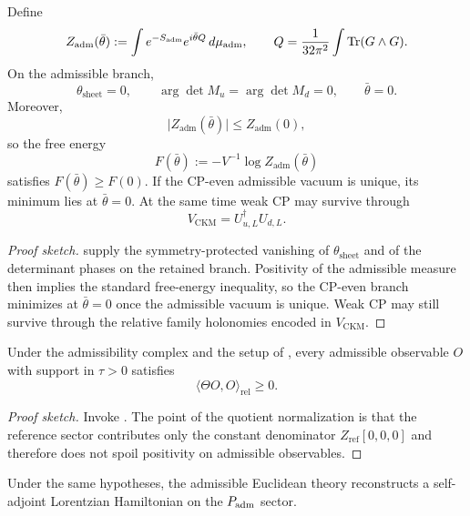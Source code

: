 
\begin{theorem}
\label{thm:strong-cp-closure}
Define
\[
Z_{\mathrm{adm}}(\bar\theta)
:=
\int e^{-S_{\mathrm{adm}}}e^{i\bar\theta Q}\,d\mu_{\mathrm{adm}},
\qquad
Q=\frac{1}{32\pi^2}\int \operatorname{Tr}(G\wedge G).
\]
On the admissible branch,
\[
\theta_{\mathrm{sheet}}=0,
\qquad
\arg\det M_u=\arg\det M_d=0,
\qquad
\bar\theta=0.
\]
Moreover,
\[
\bigl|Z_{\mathrm{adm}}(\bar\theta)\bigr|\le Z_{\mathrm{adm}}(0),
\]
so the free energy
\[
F(\bar\theta):=-V^{-1}\log Z_{\mathrm{adm}}(\bar\theta)
\]
satisfies $F(\bar\theta)\ge F(0)$. If the CP-even admissible vacuum is unique, its minimum lies at $\bar\theta=0$. At the same time weak CP may survive through
\[
V_{\mathrm{CKM}}=U_{u,L}^\dagger U_{d,L}.
\]
\end{theorem}

\begin{proof}[Proof sketch]
 supply the symmetry-protected vanishing of $\theta_{\mathrm{sheet}}$ and of the determinant phases on the retained branch. Positivity of the admissible measure then implies the standard free-energy inequality, so the CP-even branch minimizes at $\bar\theta=0$ once the admissible vacuum is unique. Weak CP may still survive through the relative family holonomies encoded in $V_{\mathrm{CKM}}$.
\end{proof}

\begin{theorem}
\label{thm:reflection-positivity-admissible}
Under the admissibility complex and the setup of , every admissible observable $O$ with support in $\tau>0$ satisfies
\[
\langle \Theta O,O\rangle_{\mathrm{rel}}\ge 0.
\]
\end{theorem}

\begin{proof}[Proof sketch]
Invoke . The point of the quotient normalization is that the reference sector contributes only the constant denominator $Z_{\mathrm{ref}}[0,0,0]$ and therefore does not spoil positivity on admissible observables.
\end{proof}

\begin{theorem}
\label{thm:lorentzian-reconstruction}
Under the same hypotheses, the admissible Euclidean theory reconstructs a self-adjoint Lorentzian Hamiltonian on the $P_{\mathrm{adm}}$ sector.
\end{theorem}

